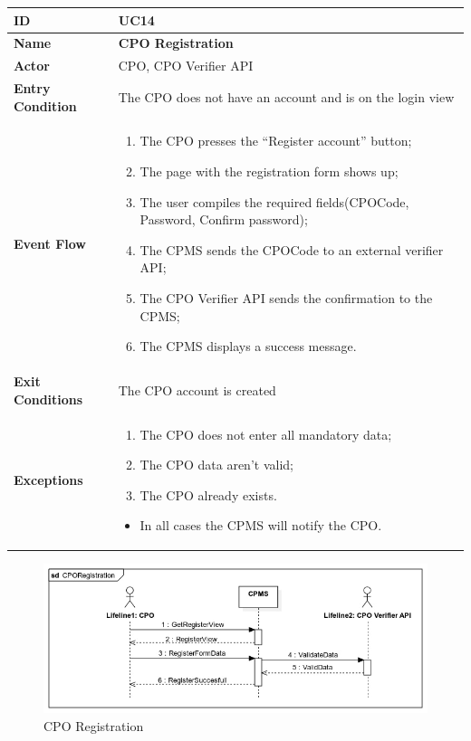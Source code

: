 \documentclass{Configuration_Files/PoliMi3i_thesis}
\begin{document}

\begin{table}[H]
    \begin{xltabular}{\textwidth}{| >{}l | X |}
    \hline
    \textbf{ID} & \textbf{UC14}\T\B\\
    \hline
    \textbf{Name} & \textbf{CPO Registration}\T\B\\
    \hline \hline
    \textbf{Actor} & CPO, CPO Verifier API\T\B \\
    \hline
    \textbf{Entry Condition} & The CPO does not have an account and is on the login view\T\B\\
    \hline
    \textbf{Event Flow} & 
        \begin{enumerate}
        \item The CPO presses the “Register account” button;
        \item The page with the registration form shows up;
        \item The user compiles the required fields(CPOCode, Password, Confirm password);
        \item The CPMS sends the CPOCode to an external verifier API;
        \item The CPO Verifier API sends the confirmation to the CPMS;
        \item The CPMS displays a success message.
        \end{enumerate}\B\\
    \hline
    \textbf{Exit Conditions} & The CPO account is created\B\\
    \hline
    \textbf{Exceptions} & \begin{enumerate}
        \item The CPO does not enter all mandatory data;
        \item The CPO data aren’t valid;
        \item The CPO already exists.
        \end{enumerate}
        \begin{itemize}
            \item In all cases the CPMS will notify the CPO.
        \end{itemize}\B\\
    \hline
    \end{xltabular}
\end{table}

\begin{figure}[H]
    \centering
    \includegraphics[width=1\textwidth]{Images/UseCases/CPORegistration.jpg}
    \caption{CPO Registration}
\end{figure}
\end{document}
